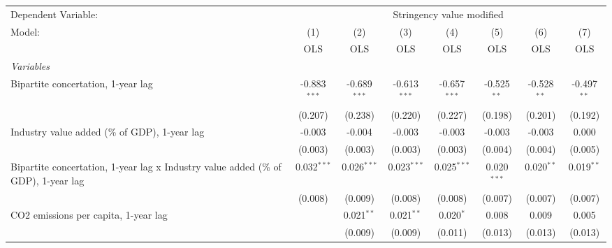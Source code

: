 
\begingroup
\centering
\begin{tabular}{lccccccc}
   \toprule
   Dependent Variable: & \multicolumn{7}{c}{Stringency value modified}\\
   Model:                                                                             & (1)            & (2)            & (3)            & (4)            & (5)           & (6)           & (7)\\  
                                                                                      &  OLS           & OLS            & OLS            & OLS            & OLS           & OLS           & OLS\\  
   \midrule
   \emph{Variables}\\
   Bipartite concertation, 1-year lag                                                 & -0.883$^{***}$ & -0.689$^{***}$ & -0.613$^{***}$ & -0.657$^{***}$ & -0.525$^{**}$ & -0.528$^{**}$ & -0.497$^{**}$\\   
                                                                                      & (0.207)        & (0.238)        & (0.220)        & (0.227)        & (0.198)       & (0.201)       & (0.192)\\   
   Industry value added (\% of GDP), 1-year lag                                       & -0.003         & -0.004         & -0.003         & -0.003         & -0.003        & -0.003        & 0.000\\   
                                                                                      & (0.003)        & (0.003)        & (0.003)        & (0.003)        & (0.004)       & (0.004)       & (0.005)\\   
   Bipartite concertation, 1-year lag x Industry value added (\% of GDP), 1-year lag  & 0.032$^{***}$  & 0.026$^{***}$  & 0.023$^{***}$  & 0.025$^{***}$  & 0.020$^{***}$ & 0.020$^{**}$  & 0.019$^{**}$\\   
                                                                                      & (0.008)        & (0.009)        & (0.008)        & (0.008)        & (0.007)       & (0.007)       & (0.007)\\   
   CO2 emissions per capita, 1-year lag                                               &                & 0.021$^{**}$   & 0.021$^{**}$   & 0.020$^{*}$    & 0.008         & 0.009         & 0.005\\   
                                                                                      &                & (0.009)        & (0.009)        & (0.011)        & (0.013)       & (0.013)       & (0.013)\\   

\end{tabular}
